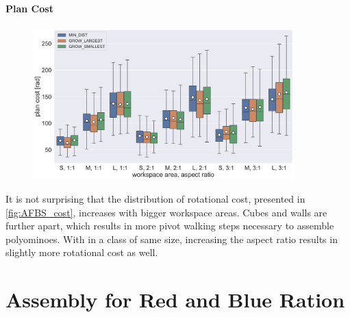\paragraph{Plan Cost} 

\begin{figure}
	\centering
	\includegraphics[width=0.9\textwidth]{figures/plots/AFBS_cost.pdf}
	\caption[]{}
	\label{fig:AFBS_cost}
\end{figure}

It is not surprising that the distribution of rotational cost, presented in \autoref{fig:AFBS_cost}, increases with bigger workspace areas.
Cubes and walls are further apart, which results in more pivot walking steps necessary to assemble polyominoes.
With in a class of same size, increasing the aspect ratio results in slightly more rotational cost as well.





\section{Assembly for Red and Blue Ration}
\label{sec:AFNR}

